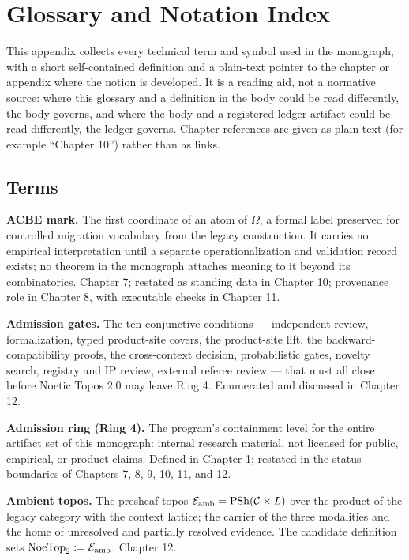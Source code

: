 \chapter{Glossary and Notation Index}
\label{appD:chapter}

This appendix collects every technical term and symbol used in the
monograph, with a short self-contained definition and a plain-text
pointer to the chapter or appendix where the notion is developed. It is
a reading aid, not a normative source: where this glossary and a
definition in the body could be read differently, the body governs, and
where the body and a registered ledger artifact could be read
differently, the ledger governs. Chapter references are given as plain
text (for example ``Chapter 10'') rather than as links.

\section{Terms}
\label{appD:sec:terms}

\textbf{ACBE mark.} The first coordinate of an atom of $\Omega$, a
formal label preserved for controlled migration vocabulary from the
legacy construction. It carries no empirical interpretation until a
separate operationalization and validation record exists; no theorem in
the monograph attaches meaning to it beyond its combinatorics.
Chapter 7; restated as standing data in Chapter 10; provenance role in
Chapter 8, with executable checks in Chapter 11.

\textbf{Admission gates.} The ten conjunctive conditions --- independent
review, formalization, typed product-site covers, the product-site
lift, the backward-compatibility proofs, the cross-context decision,
probabilistic gates, novelty search, registry and IP review, external
referee review --- that must all close before Noetic Topos 2.0 may
leave Ring 4. Enumerated and discussed in Chapter 12.

\textbf{Admission ring (Ring 4).} The program's containment level for
the entire artifact set of this monograph: internal research material,
not licensed for public, empirical, or product claims. Defined in
Chapter 1; restated in the status boundaries of Chapters 7, 8, 9, 10,
11, and 12.

\textbf{Ambient topos.} The presheaf topos
$\mathcal{E}_{\mathrm{amb}} = \mathrm{PSh}(\mathcal{C} \times L)$ over the product of the legacy category
with the context lattice; the carrier of the three modalities and the
home of unresolved and partially resolved evidence. The candidate
definition sets $\mathrm{NoeTop}_2 := \mathcal{E}_{\mathrm{amb}}$. Chapter 12.

